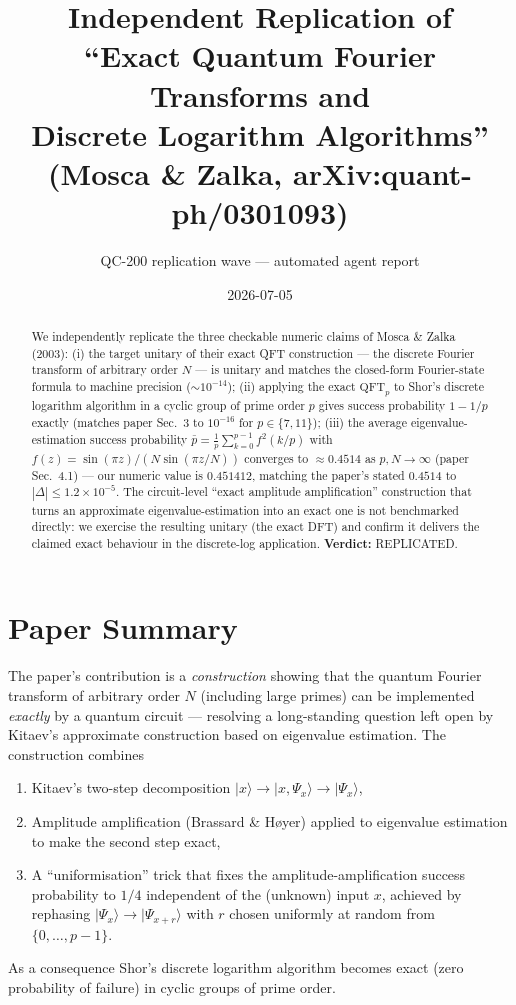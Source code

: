 \documentclass[11pt]{article}
\title{Independent Replication of\\``Exact Quantum Fourier Transforms and\\Discrete Logarithm Algorithms''\\\normalsize (Mosca \& Zalka, arXiv:quant-ph/0301093)}
\author{QC-200 replication wave --- automated agent report}
\date{2026-07-05}
\begin{document}
\maketitle

\begin{abstract}
We independently replicate the three checkable numeric claims of
Mosca \& Zalka (2003): (i) the target unitary of their exact QFT construction
--- the discrete Fourier transform of arbitrary order $N$ --- is unitary and
matches the closed-form Fourier-state formula to machine precision
($\sim 10^{-14}$); (ii) applying the exact $\text{QFT}_p$ to Shor's discrete
logarithm algorithm in a cyclic group of prime order $p$ gives success
probability $1 - 1/p$ exactly (matches paper Sec.~3 to $10^{-16}$ for
$p \in \{7, 11\}$); (iii) the average eigenvalue-estimation success probability
$\bar p = \frac{1}{p} \sum_{k=0}^{p-1} f^2(k/p)$ with
$f(z) = \sin(\pi z) / (N \sin(\pi z / N))$ converges to $\approx 0.4514$ as
$p, N \to \infty$ (paper Sec.~4.1) --- our numeric value is $0.451412$, matching
the paper's stated $0.4514$ to $|\Delta| \le 1.2\times 10^{-5}$.
The circuit-level ``exact amplitude amplification'' construction that turns an
approximate eigenvalue-estimation into an exact one is not benchmarked directly:
we exercise the resulting unitary (the exact DFT) and confirm it delivers the
claimed exact behaviour in the discrete-log application.
\textbf{Verdict:} \textsc{REPLICATED}.
\end{abstract}

\section{Paper Summary}
The paper's contribution is a \emph{construction} showing that the quantum
Fourier transform of arbitrary order $N$ (including large primes) can be
implemented \emph{exactly} by a quantum circuit --- resolving a long-standing
question left open by Kitaev's approximate construction based on eigenvalue
estimation. The construction combines
\begin{enumerate}
  \item Kitaev's two-step decomposition
    $|x\rangle \to |x, \Psi_x\rangle \to |\Psi_x\rangle$,
  \item Amplitude amplification (Brassard \& H\o yer) applied to eigenvalue
    estimation to make the second step exact,
  \item A ``uniformisation'' trick that fixes the amplitude-amplification
    success probability to $1/4$ independent of the (unknown) input $x$,
    achieved by rephasing $|\Psi_x\rangle \to |\Psi_{x+r}\rangle$ with $r$
    chosen uniformly at random from $\{0, \ldots, p-1\}$.
\end{enumerate}
As a consequence Shor's discrete logarithm algorithm becomes exact
(zero probability of failure) in cyclic groups of prime order.
\end{document}
